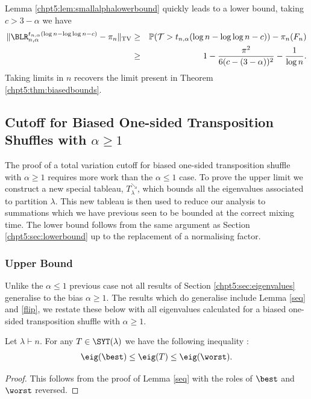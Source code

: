 \documentclass[11pt]{report}
\begin{document}
Lemma \ref{chpt5:lem:smallalphalowerbound} quickly leads to a lower bound, taking $c> 3-\alpha$ we have
\begin{eqnarray*}
	\lVert \BLR_{n,\alpha}^{t_{n,\alpha}(\log n - \log \log n -c)} -\pi_{n} \rVert_{\tiny \textnormal{TV}} &\geq &\mathbb{P}(\mathcal{T} > t_{n,\alpha}(\log n - \log \log n -c)) - \pi_{n} (F_{n})\\
	& \geq &1 - \frac{\pi^{2}}{6(c-(3-\alpha))^{2}} - \frac{1}{\log n}.
\end{eqnarray*}
Taking limits in $n$ recovers the limit present in Theorem \ref{chpt5:thm:biasedbounds}.





\subsection{Cutoff for Biased One-sided Transposition Shuffles with $\alpha \geq 1$}
\label{chpt5:subsec:bigalpha}


The proof of a total variation cutoff for biased one-sided transposition shuffle with $\alpha \geq 1$  requires more work than the $\alpha \leq 1$ case. To prove the upper limit we construct  a new special tableau, $T_{\lambda}^{\searrow}$, which bounds all the eigenvalues associated to  partition $\lambda$. This new tableau is then used to reduce our analysis to summations which we have previous seen to be bounded at the correct mixing time.
The lower bound follows from the same argument as Section \ref{chpt5:sec:lowerbound} up to the replacement of a normalising factor.


\subsubsection{Upper Bound}
Unlike the  $\alpha \leq 1$ previous case not all results of Section \ref{chpt5:sec:eigenvalues} generalise to the bias $\alpha \geq 1$. The results which do generalise include Lemma \ref{seq} and \ref{flip}, we restate these below with all eigenvalues calculated for a biased one-sided transposition shuffle with $\alpha \geq 1$.

\begin{lemma}
	Let $\lambda\vdash n$. For any $T \in \SYT(\lambda)$ we have the following 
	inequality :
	\begin{eqnarray}
	\eig(\best) \leq \eig(T) \leq 
	\eig(\worst).
	\end{eqnarray}
\end{lemma}
\begin{proof}
	This follows from the proof of Lemma \ref{seq} with the roles of $\best$ and $\worst$ reversed.
\end{proof}
\end{document}
